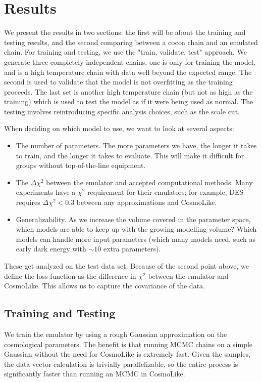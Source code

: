 \section{Results}
We present the results in two sections: the first will be about the training and testing results, and the second comparing between a cocoa chain and an emulated chain. For training and testing, we use the "train, validate, test" approach. We generate three completely independent chains, one is only for training the model, and is a high temperature chain with data well beyond the expected range. The second is used to validate that the model is not overfitting as the training proceeds. The last set is another high temperature chain (but not as high as the training) which is used to test the model as if it were being used as normal. The testing involves reintroducing specific analysis choices, such as the scale cut.

When deciding on which model to use, we want to look at several aspects:
\begin{itemize}
	\item The number of parameters. The more parameters we have, the longer it takes to train, and the longer it takes to evaluate. This will make it difficult for groups without top-of-the-line equipment.
	\item The $\Delta\chi^2$ between the emulator and accepted computational methods. Many experiments have a $\chi^2$ requirement for their emulators; for example, DES requires $\Delta\chi^2<0.3$ between any approximations and CosmoLike.
	\item Generalizability. As we increase the volume covered in the parameter space, which models are able to keep up with the growing modelling volume? Which models can handle more input parameters (which many models need, such as early dark energy with $\sim10$ extra parameters).
\end{itemize}
These get analyzed on the test data set. Because of the second point above, we define the loss function as the difference in $\chi^2$ between the emulator and CosmoLike. This allows us to capture the covariance of the data.
\subsection{Training and Testing}
We train the emulator by using a rough Gaussian approximation on the cosmological parameters. The benefit is that running MCMC chains on a simple Gaussian without the need for CosmoLike is extremely fast. Given the samples, the data vector calculation is trivially parallelizable, so the entire process is significantly faster than running an MCMC in CosmoLike. 

